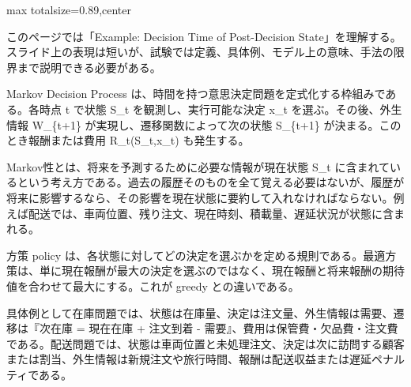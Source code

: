 \begin{minipage}[t]{0.58\textwidth}
\begin{adjustbox}{max totalsize={\textwidth}{0.89\textheight},center}
\begin{minipage}{\textwidth}\scriptsize
{}このページでは「Example: Decision Time of Post-Decision State」を理解する。スライド上の表現は短いが、試験では定義、具体例、モデル上の意味、手法の限界まで説明できる必要がある。\par
Markov Decision Process は、時間を持つ意思決定問題を定式化する枠組みである。各時点 t で状態 S\_t を観測し、実行可能な決定 x\_t を選ぶ。その後、外生情報 W\_\{t+1\} が実現し、遷移関数によって次の状態 S\_\{t+1\} が決まる。このとき報酬または費用 R\_t(S\_t,x\_t) も発生する。\par
Markov性とは、将来を予測するために必要な情報が現在状態 S\_t に含まれているという考え方である。過去の履歴そのものを全て覚える必要はないが、履歴が将来に影響するなら、その影響を現在状態に要約して入れなければならない。例えば配送では、車両位置、残り注文、現在時刻、積載量、遅延状況が状態に含まれる。\par
方策 policy は、各状態に対してどの決定を選ぶかを定める規則である。最適方策は、単に現在報酬が最大の決定を選ぶのではなく、現在報酬と将来報酬の期待値を合わせて最大にする。これが greedy との違いである。\par
具体例として在庫問題では、状態は在庫量、決定は注文量、外生情報は需要、遷移は『次在庫 = 現在在庫 + 注文到着 - 需要』、費用は保管費・欠品費・注文費である。配送問題では、状態は車両位置と未処理注文、決定は次に訪問する顧客または割当、外生情報は新規注文や旅行時間、報酬は配送収益または遅延ペナルティである。\par

\end{minipage}
\end{adjustbox}
\end{minipage}
